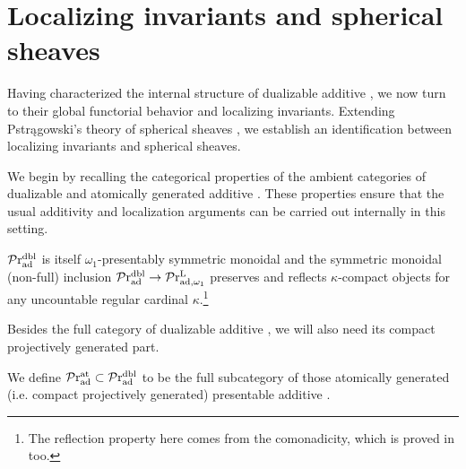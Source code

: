 \documentclass[a4paper,10pt, oneside]{amsart}
\begin{document}
	

\section{Localizing invariants and spherical sheaves}\label{section6}
Having characterized the internal structure of dualizable additive \infcats, we now turn to their global functorial behavior and localizing invariants. Extending Pstrągowski's theory of spherical sheaves \cite{pstrkagowski2023synthetic}, we establish an identification between localizing invariants and spherical sheaves.

We begin by recalling the categorical properties of the ambient categories of dualizable and atomically generated additive \infcats. These properties ensure that the usual additivity and localization arguments can be carried out internally in this setting.
	\begin{thm}\label{praddblkprl}
		$\mathcal{P}\mathrm{r}_{\mathrm{ad}}^{\mathrm{dbl}}$ is itself $\omega_1$-presentably symmetric monoidal and the symmetric monoidal (non-full) inclusion $\mathcal{P}\mathrm{r}_{\mathrm{ad}}^{\mathrm{dbl}}\to \mathcal{P}\mathrm{r}^\mathrm{L}_{\mathrm{ad},\omega_1}$ preserves and reflects $\kappa$-compact objects for any uncountable regular cardinal $\kappa$.\footnote{The reflection property here comes from the comonadicity, which is proved in \cite{ramzi2024dualizable} too.} 
	\end{thm}
	Besides the full category of dualizable additive \infcats, we will also need its compact projectively generated part.
	\begin{de}
		We define   $\mathcal{P}\mathrm{r}_{\mathrm{ad}}^{\mathrm{at}}\subset \mathcal{P}\mathrm{r}_{\mathrm{ad}}^{\mathrm{dbl}}$ to be  the  full subcategory of those atomically generated (i.e. compact projectively generated) presentable additive \infcats. 
	\end{de}
\end{document}
